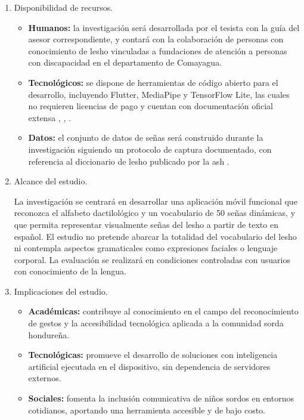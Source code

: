 \begin{enumerate}
    \item Disponibilidad de recursos.
    \begin{itemize}
        \item \textbf{Humanos:} la investigación será desarrollada por el tesista con la guía del asesor
        correspondiente, y contará con la colaboración de personas con conocimiento de
        \acrshort{lesho} vinculadas a fundaciones de atención a personas con discapacidad en el
        departamento de Comayagua.
        \item \textbf{Tecnológicos:} se dispone de herramientas de código abierto para el desarrollo,
        incluyendo Flutter, MediaPipe y TensorFlow Lite, las cuales no requieren licencias
        de pago y cuentan con documentación oficial extensa \cite{google_mediapipe_2024}, \cite{google_tflite_2024}, \cite{google_flutter_2024}.
        \item \textbf{Datos:} el conjunto de datos de señas será construido durante la investigación siguiendo un
        protocolo de captura documentado, con referencia al diccionario de \acrshort{lesho}
        publicado por la \acrshort{ash} \cite{ash_diccionario_2019}.
    \end{itemize}

    \item Alcance del estudio.

    La investigación se centrará en desarrollar una aplicación móvil funcional que
    reconozca el alfabeto dactilológico y un vocabulario de 50 señas dinámicas, y que
    permita representar visualmente señas del \acrshort{lesho} a partir de texto en español. El
    estudio no pretende abarcar la totalidad del vocabulario del \acrshort{lesho} ni contempla
    aspectos gramaticales como expresiones faciales o lenguaje corporal. La evaluación
    se realizará en condiciones controladas con usuarios con conocimiento de la lengua.

    \item Implicaciones del estudio.
    \begin{itemize}
        \item \textbf{Académicas:} contribuye al conocimiento en el campo del reconocimiento de gestos
        y la accesibilidad tecnológica aplicada a la comunidad sorda hondureña.
        \item \textbf{Tecnológicas:} promueve el desarrollo de soluciones con inteligencia artificial
        ejecutada en el dispositivo, sin dependencia de servidores externos.
        \item \textbf{Sociales:} fomenta la inclusión comunicativa de niños sordos en entornos
        cotidianos, aportando una herramienta accesible y de bajo costo.
    \end{itemize}


\end{enumerate}
